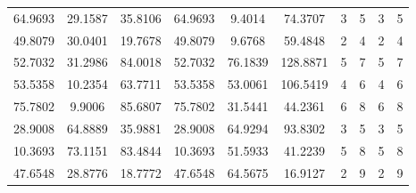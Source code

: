 \documentclass[withoutpreface,bwprint]{cumcmthesis}
\begin{document}
\begin{appendices}
\begin{table}[htbp!]
\begin{tabular}{@{}cccccccccc@{}}
				64.9693                          & 29.1587                          & 35.8106                          & 64.9693                          & 9.4014                           & 74.3707                          & 3                    & 5                    & 3                      & 5                      \\
				49.8079                          & 30.0401                          & 19.7678                          & 49.8079                          & 9.6768                           & 59.4848                          & 2                    & 4                    & 2                      & 4                      \\
				52.7032                          & 31.2986                          & 84.0018                          & 52.7032                          & 76.1839                          & 128.8871                         & 5                    & 7                    & 5                      & 7                      \\
				53.5358                          & 10.2354                          & 63.7711                          & 53.5358                          & 53.0061                          & 106.5419                         & 4                    & 6                    & 4                      & 6                      \\
				75.7802                          & 9.9006                           & 85.6807                          & 75.7802                          & 31.5441                          & 44.2361                          & 6                    & 8                    & 6                      & 8                      \\
				28.9008                          & 64.8889                          & 35.9881                          & 28.9008                          & 64.9294                          & 93.8302                          & 3                    & 5                    & 3                      & 5                      \\
				10.3693                          & 73.1151                          & 83.4844                          & 10.3693                          & 51.5933                          & 41.2239                          & 5                    & 8                    & 5                      & 8                      \\
				47.6548                          & 28.8776                          & 18.7772                          & 47.6548                          & 64.5675                          & 16.9127                          & 2                    & 9                    & 2                      & 9                      \\

\end{tabular}
\end{table}
\end{appendices}
\end{document}
